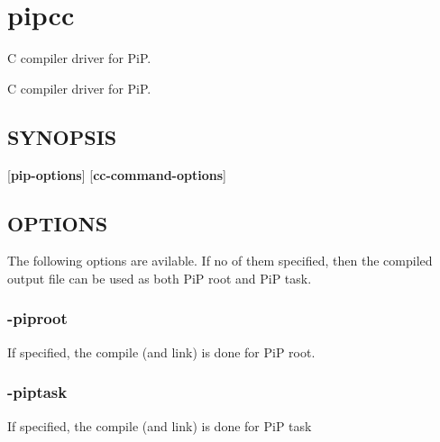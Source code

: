 \hypertarget{group__pipcc}{\section{pipcc}
\label{group__pipcc}
}


C compiler driver for Pi\-P.  


C compiler driver for Pi\-P. \hypertarget{group__piplnlibs_synopsis}{}\subsection{S\-Y\-N\-O\-P\-S\-I\-S}\label{group__piplnlibs_synopsis}
{ }\mbox{[}{\bfseries pip-\/options}\mbox{]} \mbox{[}{\bfseries cc-\/command-\/options}\mbox{]}\hypertarget{group__piplnlibs_options}{}\subsection{O\-P\-T\-I\-O\-N\-S}\label{group__piplnlibs_options}
The following options are avilable. If no of them specified, then the compiled output file can be used as both Pi\-P root and Pi\-P task.\hypertarget{group__pipcc_root}{}\subsubsection{-\/piproot}\label{group__pipcc_root}
If specified, the compile (and link) is done for Pi\-P root.\hypertarget{group__pipcc_task}{}\subsubsection{-\/piptask}\label{group__pipcc_task}
If specified, the compile (and link) is done for Pi\-P task 